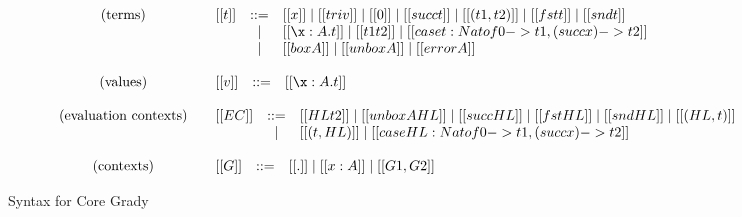 \begin{figure}
\begin{mdframed}
\[\begin{array}{cl}
        \begin{array}{l}
          \text{(terms)}\\\\\\
        \end{array}     &
        \begin{array}{lcl}
          [[t]] & ::= & [[x]] \mid [[triv]] \mid [[0]] \mid [[succ t]] \mid [[(t1 , t2)]] \mid [[fst t]] \mid [[snd t]] \\ & \mid & [[\x : A.t]] \mid [[t1 t2]] \mid [[case t : Nat of 0 -> t1, (succ x) -> t2]]\\ & \mid & [[box A]] \mid [[unbox A]] \mid [[error A]]\\
        \end{array}
        \\\\
        \begin{array}{l}
          \text{(values)}\\
        \end{array}     &
        \begin{array}{lcl}
          [[v]] & ::= & [[\x : A.t]]\\
        \end{array}
        \\\\
        \begin{array}{lll}
          \text{(evaluation contexts)}\\\\
        \end{array}  &
        \begin{array}{lcl}
          [[EC]] & ::= & [[HL t2]] \mid [[unbox A HL]] \mid [[succ HL]] \mid [[fst HL]] \mid [[snd HL]] \mid [[(HL, t)]] \\ & \mid & [[(t, HL)]] \mid [[case HL : Nat of 0 -> t1, (succ x) -> t2]]\\
        \end{array}\\\\
        
        \begin{array}{lll}
          \text{(contexts)}\\
        \end{array}  &
        \begin{array}{lcl}
          [[G]] & ::= & [[.]] \mid [[x : A]] \mid [[G1,G2]]\\
        \end{array}\\
      \end{array}
      \]    
    \end{mdframed}
    \caption{Syntax for Core Grady}
    \label{fig:syntax-core-grady}
\end{figure}
